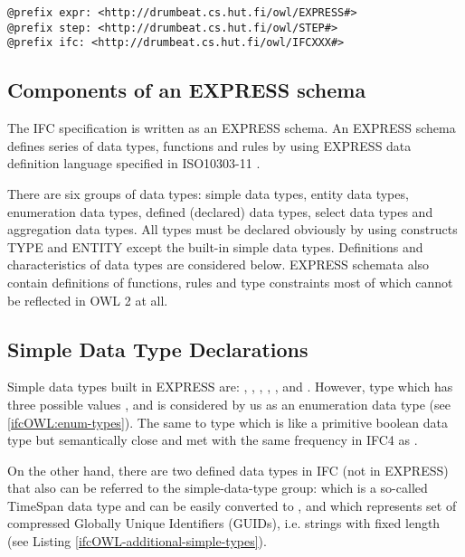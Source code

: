 \begin{lstlisting}[caption={Namespace definitions},label=ifcOWL-namespaces]
@prefix expr: <http://drumbeat.cs.hut.fi/owl/EXPRESS#>
@prefix step: <http://drumbeat.cs.hut.fi/owl/STEP#>
@prefix ifc: <http://drumbeat.cs.hut.fi/owl/IFCXXX#>
\end{lstlisting}

\subsection{Components of an EXPRESS schema}
The IFC specification is written as an EXPRESS schema. An EXPRESS schema defines series of data types, functions and rules by using EXPRESS data definition language specified in ISO10303-11 \cite{wiki:express,noauthor:ifc-guide}.

There are six groups of data types: simple data types, entity data types, enumeration data types, defined (declared) data types, select data types and aggregation data types. All types must be declared obviously by using constructs TYPE and ENTITY except the built-in simple data types. Definitions and characteristics of data types are considered below. EXPRESS schemata also contain definitions of functions, rules and type constraints most of which cannot be reflected in OWL 2 at all.

\subsection{Simple Data Type Declarations}
\label{ifcOWL:simple-type}

Simple data types built in EXPRESS are: , , , , ,  and . However, type  which has three possible values ,  and  is considered by us as an enumeration data type (see \ref{ifcOWL:enum-types}). The same to type  which is like a primitive boolean data type but semantically close and met with the same frequency in IFC4 as .

On the other hand, there are two defined data types in IFC (not in EXPRESS) that also can be referred to the simple-data-type group:  which is a so-called TimeSpan data type and can be easily converted to , and  which represents set of compressed Globally Unique Identifiers (GUIDs), i.e. strings with fixed length (see Listing \ref{ifcOWL-additional-simple-types}). 

